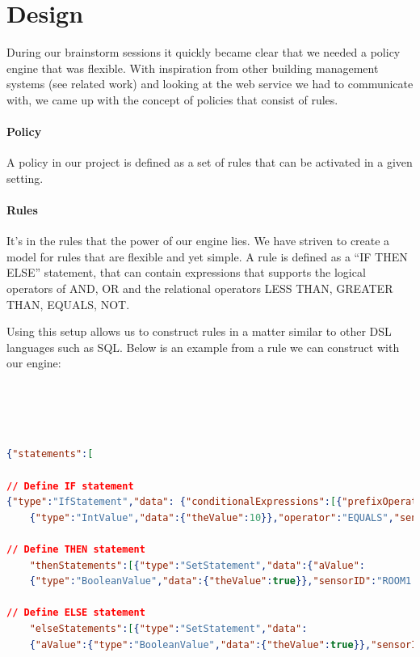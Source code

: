 \section{Design}
During our brainstorm sessions it quickly became clear that we needed a policy engine that was flexible. With inspiration from other building management systems (see related work) and looking at the web service we had to communicate with, we came up with the concept of policies that consist of rules.

\paragraph{Policy}
A policy in our project is defined as a set of rules that can be activated in a given setting.

\paragraph{Rules}
It's in the rules that the power of our engine lies. We have striven to create a model for rules that are flexible and yet simple. A rule is defined as a "`IF THEN ELSE"' statement, that can contain expressions that supports the logical operators of AND, OR and the relational operators LESS THAN, GREATER THAN, EQUALS, NOT. 

Using this setup allows us to construct rules in a matter similar to other DSL languages such as SQL. Below is an example from a rule we can construct with our engine:
\\
\\
\\
\\
\\
\begin{lstlisting}[language=json,firstnumber=1]
{"statements":[

// Define IF statement
{"type":"IfStatement","data": {"conditionalExpressions":[{"prefixOperator":"AND","aValue":
	{"type":"IntValue","data":{"theValue":10}},"operator":"EQUALS","sensorId":"ROOM1.TEMPERATURE"}],

// Define THEN statement	
	"thenStatements":[{"type":"SetStatement","data":{"aValue":
	{"type":"BooleanValue","data":{"theValue":true}},"sensorID":"ROOM1.HEATER"}}],

// Define ELSE statement
	"elseStatements":[{"type":"SetStatement","data":
	{"aValue":{"type":"BooleanValue","data":{"theValue":true}},"sensorID":"ROOM1.BLINDS"}}]}}]}
\end{lstlisting}

